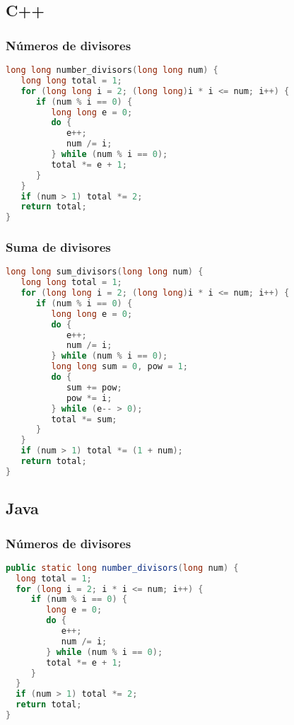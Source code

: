 \subsection{C++}

\subsubsection{Números de divisores}
\begin{lstlisting}[language=C++]
long long number_divisors(long long num) {
   long long total = 1;
   for (long long i = 2; (long long)i * i <= num; i++) {
      if (num % i == 0) {
         long long e = 0;
         do {
            e++;
            num /= i;
         } while (num % i == 0);
         total *= e + 1;
      }
   }
   if (num > 1) total *= 2;
   return total;
}
\end{lstlisting}


\subsubsection{Suma de divisores}
\begin{lstlisting}[language=C++]
long long sum_divisors(long long num) {
   long long total = 1;
   for (long long i = 2; (long long)i * i <= num; i++) {
      if (num % i == 0) {
         long long e = 0;
         do {
            e++;
            num /= i;
         } while (num % i == 0);
         long long sum = 0, pow = 1;
         do {
            sum += pow;
            pow *= i;
         } while (e-- > 0);
         total *= sum;
      }
   }
   if (num > 1) total *= (1 + num);
   return total;
}
\end{lstlisting}


\subsection{Java}

\subsubsection{Números de divisores}
\begin{lstlisting}[language=Java]
public static long number_divisors(long num) {
  long total = 1;
  for (long i = 2; i * i <= num; i++) {
     if (num % i == 0) {
        long e = 0;
        do {
           e++;
           num /= i;
        } while (num % i == 0);
        total *= e + 1;
     }
  }
  if (num > 1) total *= 2;
  return total;
}
\end{lstlisting}


